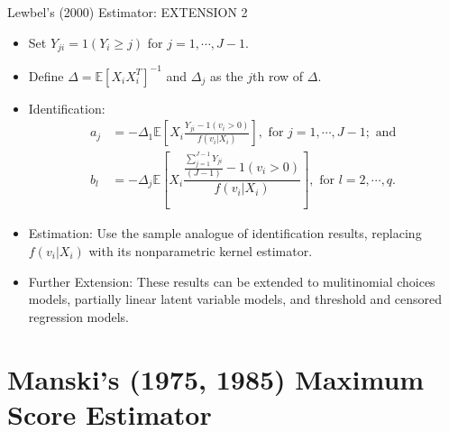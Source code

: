 \documentclass[xcolor=svgnames,dvipdfmx,cjk]{beamer}
\theoremstyle{example}
\def\E{\mathbb{E}}
\begin{document}
\begin{frame}{Lewbel's (2000) Estimator: \alert{EXTENSION 2}}
  \begin{itemize}
    \item Set $Y_{ji} = 1(Y_i \geq j)$ for $j = 1, \cdots, J-1$.
    \item Define $\Delta = \E[X_iX_i^T]^{-1}$ 
          and $\Delta_j$ as the $j$th row of $\Delta$.
    \item \alert{Identification}:
          \begin{align*}
            a_j &= - \Delta_1 
                    \E\left[
                      X_i
                      \frac{Y_{ji} - 1(v_i > 0)}{f(v_i|X_i)}
                    \right],
                    \text{ for } j = 1, \cdots, J-1; \text{ and } \\
            b_l &= - \Delta_j
                    \E\left[
                      X_i
                      \dfrac{
                      \frac{\sum_{j=1}^{J-1} Y_{ji}}{(J-1)}- 1(v_i > 0)}
                      {f(v_i|X_i)}
                    \right],
                    \text{ for } l = 2, \cdots, q.
          \end{align*}
    \item \alert{Estimation}:
          Use the sample analogue of identification results, 
          replacing $f(v_i|X_i)$ with its nonparametric kernel estimator.
    \item \alert{Further Extension}: 
          These results can be extended to 
          mulitinomial choices models, partially linear latent variable models,
          and threshold and censored regression models.
  \end{itemize}
\end{frame}


  
\section{Manski's (1975, 1985) Maximum Score Estimator}
  
\end{document}
